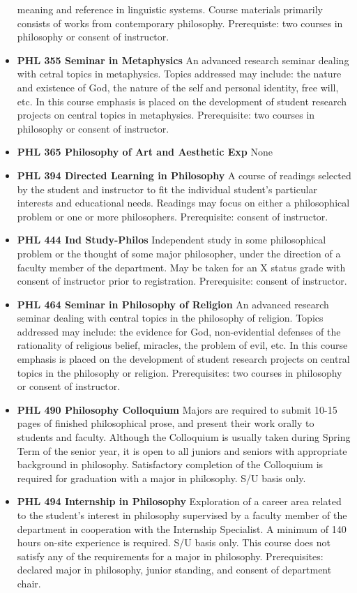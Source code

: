 \documentclass[
  letterpaper,
]{scrbook}
\begin{document}
\begin{itemize}
  meaning and reference in linguistic systems. Course materials
  primarily consists of works from contemporary philosophy. Prerequiste:
  two courses in philosophy or consent of instructor.
\item
  \textbf{PHL 355 Seminar in Metaphysics} An advanced research seminar
  dealing with cetral topics in metaphysics. Topics addressed may
  include: the nature and existence of God, the nature of the self and
  personal identity, free will, etc. In this course emphasis is placed
  on the development of student research projects on central topics in
  metaphysics. Prerequisite: two courses in philosophy or consent of
  instructor.
\item
  \textbf{PHL 365 Philosophy of Art and Aesthetic Exp} None
\item
  \textbf{PHL 394 Directed Learning in Philosophy} A course of readings
  selected by the student and instructor to fit the individual student's
  particular interests and educational needs. Readings may focus on
  either a philosophical problem or one or more philosophers.
  Prerequisite: consent of instructor.
\item
  \textbf{PHL 444 Ind Study-Philos} Independent study in some
  philosophical problem or the thought of some major philosopher, under
  the direction of a faculty member of the department. May be taken for
  an X status grade with consent of instructor prior to registration.
  Prerequisite: consent of instructor.
\item
  \textbf{PHL 464 Seminar in Philosophy of Religion} An advanced
  research seminar dealing with central topics in the philosophy of
  religion. Topics addressed may include: the evidence for God,
  non-evidential defenses of the rationality of religious belief,
  miracles, the problem of evil, etc. In this course emphasis is placed
  on the development of student research projects on central topics in
  the philosophy or religion. Prerequisites: two courses in philosophy
  or consent of instructor.
\item
  \textbf{PHL 490 Philosophy Colloquium} Majors are required to submit
  10-15 pages of finished philosophical prose, and present their work
  orally to students and faculty. Although the Colloquium is usually
  taken during Spring Term of the senior year, it is open to all juniors
  and seniors with appropriate background in philosophy. Satisfactory
  completion of the Colloquium is required for graduation with a major
  in philosophy. S/U basis only.
\item
  \textbf{PHL 494 Internship in Philosophy} Exploration of a career area
  related to the student's interest in philosophy supervised by a
  faculty member of the department in cooperation with the Internship
  Specialist. A minimum of 140 hours on-site experience is required. S/U
  basis only. This course does not satisfy any of the requirements for a
  major in philosophy. Prerequisites: declared major in philosophy,
  junior standing, and consent of department chair.
\end{itemize}
\end{document}
